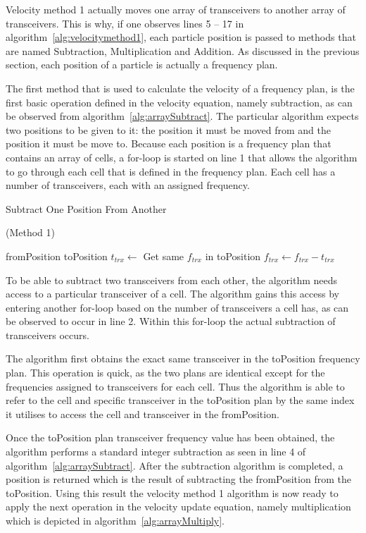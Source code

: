Velocity method 1 actually moves one array of transceivers to another array of transceivers. This is why, if one observes lines 5 -- 17 in algorithm~\ref{alg:velocitymethod1}, each particle position is passed to methods that are named Subtraction, Multiplication and Addition. As discussed in the previous section, each position of a particle is actually a frequency plan.


The first method that is used to calculate the velocity of a frequency plan, is the first basic operation defined in the velocity equation, namely subtraction, as can be observed from algorithm~\ref{alg:arraySubtract}. The particular algorithm expects two positions to be given to it: the position it must be moved from and the position it must be move to. Because each position is a frequency plan that contains an array of cells, a for-loop is started on line 1 that allows the algorithm to go through each cell that is defined in the frequency plan. Each cell has a number of transceivers, each with an assigned frequency. 
\begin{algorithm}[H]
\caption{Subtract One Position From Another} (Method 1)
\label{alg:arraySubtract}
\begin{algorithmic}[1]
	\Require fromPosition
	\Require toPosition
			\State $t_{trx} \leftarrow$ Get same $f_{trx}$ in toPosition
			\State $f_{trx} \leftarrow f_{trx} - t_{trx}$
		\EndFor
	\EndFor
\end{algorithmic}
\end{algorithm}


To be able to subtract two transceivers from each other, the algorithm needs access to a particular transceiver of a cell. The algorithm gains this access by entering another for-loop based on the number of transceivers a cell has, as can be observed to occur in line 2. Within this for-loop the actual subtraction of transceivers occurs.

The algorithm first obtains the exact same transceiver in the toPosition frequency plan. This operation is quick, as the two plans are identical except for the frequencies assigned to transceivers for each cell. Thus the algorithm is able to refer to the cell and specific transceiver in the toPosition plan by the same index it utilises to access the cell and transceiver in the fromPosition.

Once the toPosition plan transceiver frequency value has been obtained, the algorithm performs a standard integer subtraction as seen in line 4 of algorithm~\ref{alg:arraySubtract}.
After the subtraction algorithm is completed, a position is returned which is the result of subtracting the fromPosition from the toPosition. Using this result the velocity method 1 algorithm is now ready to apply the next operation in the velocity update equation, namely multiplication which is depicted in algorithm~\ref{alg:arrayMultiply}.

